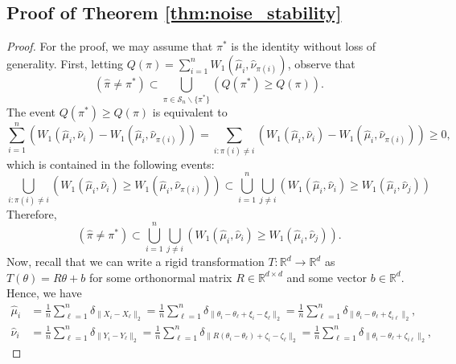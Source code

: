\documentclass[11pt,letterpaper]{article}
\theoremstyle{definition}
\numberwithin{equation}{section}
\newcommand{\cS}{\mathcal{S}}
\newcommand{\R}{\mathbb{R}}
\begin{document}
\subsection{Proof of Theorem \ref{thm:noise_stability}}
\begin{proof}
    For the proof, we may assume that $\pi^\ast$ is the identity without loss of generality. First, letting $Q(\pi) = \sum_{i = 1}^{n} W_1(\hat{\mu}_i, \hat{\nu}_{\pi(i)})$, observe that
    \begin{equation*}
        \left(\hat{\pi} \neq \pi^\ast\right) \subset \bigcup_{\pi \in \cS_n \backslash \{\pi^\ast\}} \left(Q(\pi^\ast) \ge Q(\pi)\right).
    \end{equation*}
    The event $Q(\pi^\ast) \ge Q(\pi)$ is equivalent to 
    \begin{equation*}
        \sum_{i = 1}^{n} \left(W_1(\hat{\mu}_i, \hat{\nu}_i) - W_1(\hat{\mu}_{i}, \hat{\nu}_{\pi(i)})\right) = \sum_{i : \pi(i) \neq i} \left(W_1(\hat{\mu}_i, \hat{\nu}_i) - W_1(\hat{\mu}_{i}, \hat{\nu}_{\pi(i)})\right) \ge 0,
    \end{equation*}
    which is contained in the following events:
    \begin{equation*}
        \bigcup_{i : \pi(i) \neq i} \left(W_1(\hat{\mu}_i, \hat{\nu}_i) \ge W_1(\hat{\mu}_{i}, \hat{\nu}_{\pi(i)})\right) \subset \bigcup_{i = 1}^{n} \bigcup_{j \neq i} \left(W_1(\hat{\mu}_i, \hat{\nu}_i) \ge W_1(\hat{\mu}_i, \hat{\nu}_j)\right) 
    \end{equation*}
    Therefore, 
    \begin{equation}
        \label{eq:assigment-based_matching_fail}
        \left(\hat{\pi} \neq \pi^\ast\right) \subset \bigcup_{i = 1}^{n} \bigcup_{j \neq i} \left(W_1(\hat{\mu}_i, \hat{\nu}_i) \ge W_1(\hat{\mu}_i, \hat{\nu}_j)\right).
    \end{equation}
    Now, recall that we can write a rigid transformation $T \colon \R^d \to \R^d$ as $T(\theta) = R \theta + b$ for some orthonormal matrix $R \in \R^{d \times d}$ and some vector $b \in \R^d$. Hence, we have 
    \begin{align*}
        \hat{\mu}_i & = \frac{1}{n} \sum_{\ell = 1}^{n} \delta_{\|X_i - X_\ell\|_2} = \frac{1}{n} \sum_{\ell = 1}^{n} \delta_{\|\theta_i - \theta_\ell + \xi_i - \xi_\ell\|_2} = \frac{1}{n} \sum_{\ell = 1}^{n} \delta_{\|\theta_i - \theta_\ell + \xi_{i \ell}\|_2}, \\
        \hat{\nu}_i & = \frac{1}{n} \sum_{\ell = 1}^{n} \delta_{\|Y_i - Y_\ell\|_2} = \frac{1}{n} \sum_{\ell = 1}^{n} \delta_{\|R(\theta_i - \theta_\ell) + \zeta_i - \zeta_\ell\|_2} = \frac{1}{n} \sum_{\ell = 1}^{n} \delta_{\|\theta_i - \theta_\ell + \zeta_{i \ell}\|_2},

\end{align*}
\end{proof}
\end{document}
